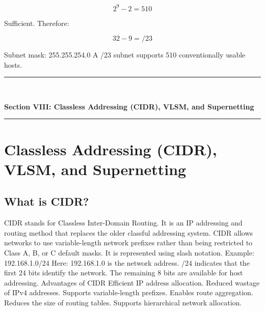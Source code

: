\[
2^9-2=510
\]

Sufficient.
Therefore:

\[
32-9=\boxed{/23}
\]

Subnet mask:
255.255.254.0
A /23 subnet supports 510 conventionally usable hosts.

\newpage

\newpage
\begin{center}
\vspace{0.5em}
{\color{primary}\rule{0.45\textwidth}{1.2pt}\\[4pt]}
{\Large\bfseries\color{primary} Section VIII: Classless Addressing (CIDR), VLSM, and Supernetting\\[2pt]}
{\color{primary}\rule{0.45\textwidth}{1.2pt}}
\vspace{0.5em}
\end{center}

\section{Classless Addressing (CIDR), VLSM, and Supernetting}

\subsection{What is CIDR?}
CIDR stands for Classless Inter-Domain Routing.
It is an IP addressing and routing method that replaces the older classful addressing system.
CIDR allows networks to use variable-length network prefixes rather than being restricted to Class A, B, or C default masks.
It is represented using slash notation.
Example:
192.168.1.0/24
Here:
192.168.1.0 is the network address.
/24 indicates that the first 24 bits identify the network.
The remaining 8 bits are available for host addressing.
Advantages of CIDR
Efficient IP address allocation.
Reduced wastage of IPv4 addresses.
Supports variable-length prefixes.
Enables route aggregation.
Reduces the size of routing tables.
Supports hierarchical network allocation.
